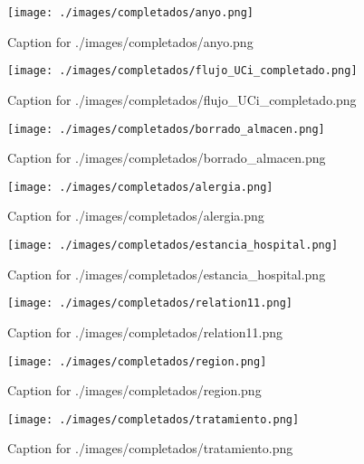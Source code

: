 \documentclass{article}
\begin{document}
\begin{figure}[H]
  \centering
  \texttt{[image: ./images/completados/anyo.png]}
  \caption{Caption for ./images/completados/anyo.png}
\end{figure}
\begin{figure}[H]
  \centering
  \texttt{[image: ./images/completados/flujo\_UCi\_completado.png]}
  \caption{Caption for ./images/completados/flujo_UCi_completado.png}
\end{figure}
\begin{figure}[H]
  \centering
  \texttt{[image: ./images/completados/borrado\_almacen.png]}
  \caption{Caption for ./images/completados/borrado_almacen.png}
\end{figure}
\begin{figure}[H]
  \centering
  \texttt{[image: ./images/completados/alergia.png]}
  \caption{Caption for ./images/completados/alergia.png}
\end{figure}
\begin{figure}[H]
  \centering
  \texttt{[image: ./images/completados/estancia\_hospital.png]}
  \caption{Caption for ./images/completados/estancia_hospital.png}
\end{figure}
\begin{figure}[H]
  \centering
  \texttt{[image: ./images/completados/relation11.png]}
  \caption{Caption for ./images/completados/relation11.png}
\end{figure}
\begin{figure}[H]
  \centering
  \texttt{[image: ./images/completados/region.png]}
  \caption{Caption for ./images/completados/region.png}
\end{figure}
\begin{figure}[H]
  \centering
  \texttt{[image: ./images/completados/tratamiento.png]}
  \caption{Caption for ./images/completados/tratamiento.png}
\end{figure}
\end{document}
